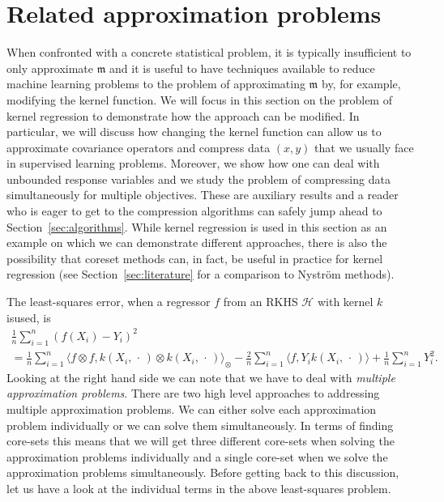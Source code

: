 \documentclass[10pt]{amsart}
\theoremstyle{definition}\newtheorem{defi}[theo]{Definition}\newtheorem{rema}[theo]{Remark}\newtheorem{exam}[theo]{Example}\newtheorem{exem}[theo]{Example}\newtheorem{nota}[theo]{Notation}
\theoremstyle{remark}
\newcommand{\cH}{\mathcal{H}}
\newcommand{\mean}{\mathfrak{m}}
\begin{document}
\section{Related approximation problems} \label{sec:related_approx}
When confronted with a concrete statistical problem, it is typically insufficient to only approximate $\mean$ and it is useful to have techniques available to reduce machine learning problems to the problem of approximating $\mean$ by, for example, modifying the kernel function. We will focus in this section on the problem of kernel regression to demonstrate how the approach can be modified. In particular, we will discuss how changing the kernel function can allow us to approximate covariance operators and compress data $(x,y)$ that we usually face in supervised learning problems. Moreover, we show how one can deal with unbounded response variables and we study the problem of compressing data simultaneously for multiple objectives. These are auxiliary results and a reader who is eager to get to the compression algorithms can safely jump ahead to Section~\ref{sec:algorithms}. While kernel regression is used in this section as an example on which we can demonstrate different approaches, there is also the possibility that coreset methods can, in fact, be useful in practice for kernel regression (see Section~\ref{sec:literature} for a comparison to Nystr\"om methods).

The least-squares error, when a regressor $f$ from an RKHS $\cH$ with kernel $k$ is\linebreak used, is
\begin{multline*}
\frac{1}{n} \sum_{i=1}^n (f(X_i) - Y_i)^2 \\
= \frac{1}{n} \sum_{i=1}^n \bigl\langle f \otimes f, k(X_i,\,\cdot\,) \otimes k(X_i,\,\cdot\,) \bigr\rangle_{\otimes} - \frac{2}{n} \sum_{i=1}^n \langle f, Y_i k(X_i,\,\cdot\,) \rangle + \frac{1}{n} \sum_{i=1}^n Y_i^2.
\end{multline*}
Looking at the right hand side we can note that we have to deal with \emph{multiple approximation problems}. There are two high level approaches to addressing multiple approximation problems. We can either solve each approximation problem individually or we can solve them simultaneously. In terms of finding core-sets this means that we will get three different core-sets when solving the approximation problems individually and a single core-set when we solve the approximation problems simultaneously. Before getting back to this discussion, let us have a look at the individual terms in the above least-squares problem.
\end{document}
